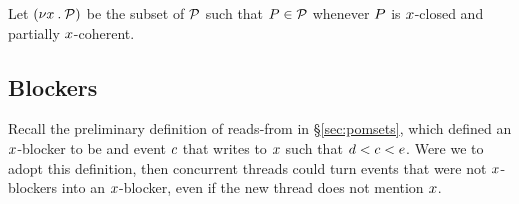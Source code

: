 \begin{definition}
Let $(\nu x\mathbin.\mathcal{P})$ be the subset of $\mathcal{P}$ such that $P\in\mathcal{P}$ whenever
$P$ is $x$-closed and partially $x$-coherent.
\end{definition}

\subsection{Blockers}
\label{sec:blockers}

Recall the preliminary definition of reads-from in \S\ref{sec:pomsets}, which
defined an $x$-blocker to be and event $c$ that writes to $x$ such that
$d < c < e$.  Were we to adopt this definition, then concurrent
threads could turn events that were not $x$-blockers into an
$x$-blocker, even if the new thread does not mention $x$.

